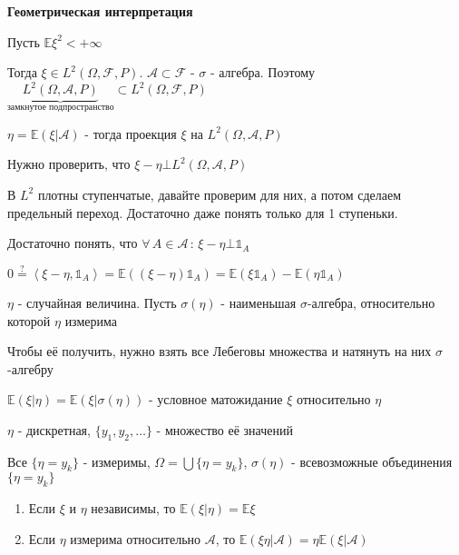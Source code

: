 \begin{remark}
    \textbf{Геометрическая интерпретация}

    Пусть $\mathbb{E} \xi^2 < +\infty$

    Тогда $\xi \in L^2 (\Omega, \mathcal{F}, P)$. $\mathcal{A} \subset \mathcal{F}$ - $\sigma$ - алгебра. Поэтому
    $\underbrace{L^2 (\Omega, \mathcal{A}, P)}_{\text{замкнутое подпространство}} \subset L^2 (\Omega, \mathcal{F}, P)$

    $\eta = \mathbb{E} (\xi | \mathcal{A})$ - тогда проекция $\xi$ на $L^2 (\Omega, \mathcal{A}, P)$

    Нужно проверить, что $\xi - \eta \bot L^2 (\Omega, \mathcal{A}, P)$

    В $L^2$ плотны ступенчатые, давайте проверим для них, а потом сделаем предельный переход. Достаточно даже понять только для 1 ступеньки.

    Достаточно понять, что $\forall \, A \in \mathcal{A} \, : \, \xi - \eta \bot \mathds{1}_A$

    $0 \overset{?}{=} \left < \xi - \eta, \mathds{1}_A \right > = \mathbb{E} ((\xi - \eta)\mathds{1}_A) = \mathbb{E}(\xi \mathds{1}_A) - \mathbb{E} (\eta \mathds{1}_A)$
\end{remark}

\begin{definition}
    $\eta$ - случайная величина. Пусть $\sigma (\eta)$ - наименьшая $\sigma$-алгебра, относительно которой $\eta$ измерима 
    
    \begin{remark}
        Чтобы её получить, нужно взять все Лебеговы множества и натянуть на них $\sigma$-алгебру
    \end{remark} 
\end{definition}

\begin{definition}
    $\mathbb{E} (\xi | \eta) = \mathbb{E} (\xi | \sigma (\eta))$ - условное матожидание $\xi$ относительно $\eta$
\end{definition}

\begin{example}
    $\eta$ - дискретная, $\{ y_1, y_2, \ldots \}$ - множество её значений

    Все $ \{ \eta = y_k \}$ - измеримы, $\Omega = \bigcup \{ \eta = y_k \} $, $\sigma (\eta)$ - всевозможные объединения $\{ \eta = y_k \}$ 
\end{example}

\begin{theorem}
    \begin{enumerate}
        \item Если $\xi$ и $\eta$ независимы, то $\mathbb{E}(\xi | \eta) = \mathbb{E} \xi$
        \item Если $\eta$ измерима относительно $\mathcal{A}$, то $\mathbb{E} (\xi \eta | \mathcal{A}) = \eta \mathbb{E} (\xi | \mathcal{A})$
    \end{enumerate}
\end{theorem}

